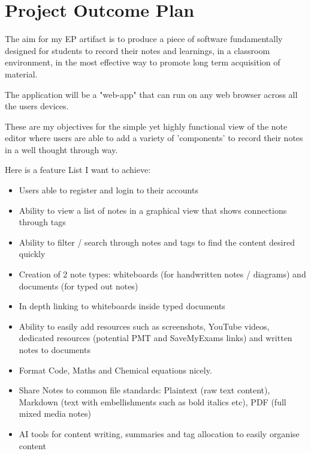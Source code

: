 \section{Project Outcome Plan}
\label{projectChoice:ProjectOutcomePlan}
The aim for my EP artifact is to produce a piece of software fundamentally designed for students to record their notes and learnings, in a classroom environment, in the most effective way to promote long term acquisition of material.

The application will be a "web-app" that can run on any web browser across all the users devices.

These are my objectives for the simple yet highly functional view of the note editor where users are able to add a variety of 'components' to record their notes in a well thought through way.

Here is a feature List I want to achieve:
\begin{itemize}
    \item Users able to register and login to their accounts
    \item Ability to view a list of notes in a graphical view that shows connections through tags
    \item Ability to filter / search through notes and tags to find the content desired quickly
    \item Creation of 2 note types: whiteboards (for handwritten notes / diagrams) and documents (for typed out notes)
    \item In depth linking to whiteboards inside typed documents
    \item Ability to easily add resources such as screenshots, YouTube videos, dedicated resources (potential PMT and SaveMyExams links) and written notes to documents
    \item Format Code, Maths and Chemical equations nicely.
    \item Share Notes to common file standards: Plaintext (raw text content), Markdown (text with embellishments such as bold italics etc), PDF (full mixed media notes)
    \item AI tools for content writing, summaries and tag allocation to easily organise content  
\end{itemize}
	

